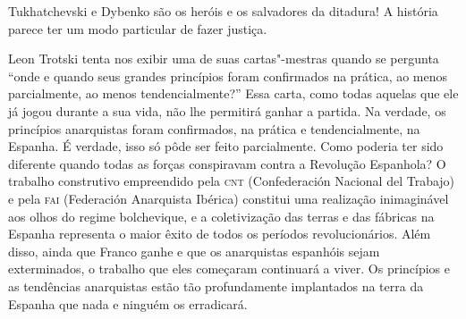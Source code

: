 Tukhatchevski e Dybenko são os heróis e os salvadores da ditadura! A
história parece ter um modo particular de fazer justiça.

Leon Trotski tenta nos exibir uma de suas cartas"-mestras quando se
pergunta “onde e quando seus grandes princípios foram confirmados na
prática, ao menos parcialmente, ao menos tendencialmente?” Essa
carta, como todas aquelas que ele já jogou durante a sua vida, não lhe
permitirá ganhar a partida. Na verdade, os princípios anarquistas foram
confirmados, na prática e tendencialmente, na Espanha. É verdade, isso só
pôde ser feito parcialmente. Como poderia ter sido diferente quando
todas as forças conspiravam contra a Revolução Espanhola? O trabalho
construtivo empreendido pela \textsc{cnt} (Confederación Nacional del Trabajo)
e pela \textsc{fai} (Federación Anarquista Ibérica) constitui uma
realização inimaginável aos olhos do regime bolchevique, e a
coletivização das terras e das fábricas na Espanha representa o maior
êxito de todos os períodos revolucionários. Além disso, ainda que
Franco ganhe e que os anarquistas espanhóis sejam exterminados, o
trabalho que eles começaram continuará a viver. Os princípios e as
tendências anarquistas estão tão profundamente implantados na terra da
Espanha que nada e ninguém os erradicará.

